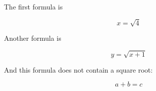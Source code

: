 \documentclass{article}
\begin{document}
The first formula is

\[
x = \sqrt{4}
\]

Another formula is

\[
y = \sqrt{x+1}
\]

And this formula does not contain a square root:

\[
a + b = c
\]
\end{document}
